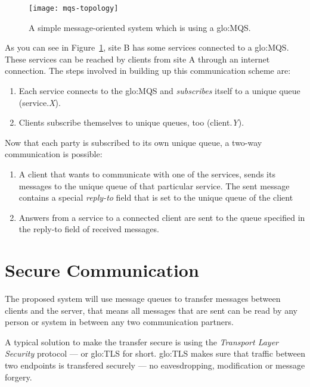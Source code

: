 \begin{figure}[htbp]
  \centering
  \texttt{[image: mqs-topology]}
  \caption[Example MQS topology]{A simple message-oriented system which is
    using a \gls{glo:MQS}.}
  \label{fig:mqs-topology}
\end{figure}

As you can see in  Figure~\ref{fig:mqs-topology}, site B has some services
connected to  a \gls{glo:MQS}.  These services can  be reached  by clients
from site A through an internet connection. The steps involved in building
up this communication scheme are:
\begin{enumerate}
\item  Each service  connects to  the \gls{glo:MQS}  and \emph{subscribes}
  itself to a unique queue (\eg service.\emph{X}).
\item    Clients   subscribe    themselves   to    unique    queues,   too
  (\eg client.\emph{Y}).
\end{enumerate}

Now  that each  party is  subscribed to  its own  unique queue,  a two-way
communication is possible:
\begin{enumerate}
\item A client  that wants to communicate with one  of the services, sends
  its messages  to the unique queue  of that particular  service. The sent
  message  contains a  special \emph{reply-to}  field that  is set  to the
  unique queue of the client
\item Answers from  a service to a connected client are  sent to the queue
  specified in the reply-to field of received messages.
\end{enumerate}

\section{Secure Communication}
\label{sec:secure-communication}

The proposed system  will use message queues to  transfer messages between
clients and the server, that means  all messages that are sent can be read
by any person or system in between any two communication partners. 

A   typical  solution   to  make   the  transfer   secure  is   using  the
\emph{Transport Layer  Security} protocol --- or  \gls{glo:TLS} for short.
\gls{glo:TLS} makes sure that  traffic between two endpoints is transfered
securely --- \ie no eavesdropping, modification or message forgery.

